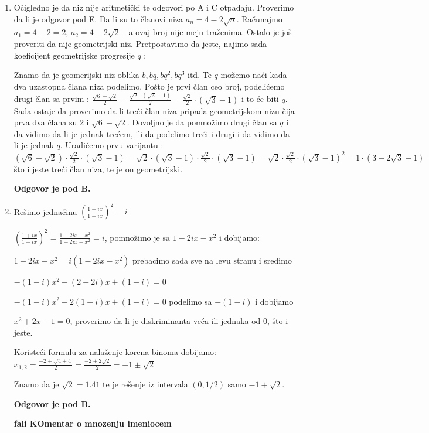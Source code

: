 \documentclass[a4paper,12pt]{report}
\begin{document}
\begin{enumerate}[1.]
\item O\v{c}igledno je da niz nije aritmeti\v{c}ki te odgovori po A i C otpadaju. Proverimo da li je odgovor pod E. Da li su to \v{c}lanovi niza $a_n = 4 - 2\sqrt{n} $. Ra\v{c}unajmo $a_1 = 4-2 = 2$, $a_2 = 4 - 2\sqrt{2}$ - a ovaj broj nije me\d{j}u tra\v{z}enima. Ostalo je jo\v{s} proveriti da nije geometrijski niz. Pretpostavimo da jeste, na\d{j}imo sada koeficijent geometrijske progresije $q$ :
\par Znamo da je geomerijski niz oblika $b, bq, bq^2, bq^3$ itd. Te $q$ mo\v{z}emo na\'{c}i kada dva uzastopna \v{c}lana niza podelimo. Po\v{s}to je prvi \v{c}lan ceo broj, podeli\'{c}emo drugi \v{c}lan sa prvim : $ \frac{\sqrt{6} - \sqrt{2}}{2} = \frac{\sqrt{2} \cdot (\sqrt{3} - 1)}{2} =\frac{\sqrt{2}}{2} \cdot (\sqrt{3} - 1) $ i to \'{c}e biti $q$. Sada ostaje da proverimo da li tre\'{c}i \v{c}lan niza pripada geometrijskom nizu \v{c}ija prva dva \v{c}lana su 2 i $\sqrt{6} - \sqrt{2}$. Dovoljno je da pomno\v{z}imo drugi \v{c}lan sa $q$ i da vidimo da li je jednak tre\'{c}em, ili da podelimo tre\'{c}i i drugi i da vidimo da li je jednak $q$. Uradi\'{c}emo prvu varijantu : $(\sqrt{6} - \sqrt{2}) \cdot \frac{\sqrt{2}}{2} \cdot (\sqrt{3} - 1) = \sqrt{2} \cdot (\sqrt{3} - 1) \cdot \frac{\sqrt{2}}{2} \cdot (\sqrt{3} - 1) = \sqrt{2} \cdot \frac{\sqrt{2}}{2} \cdot (\sqrt{3} - 1)^2 = 1 \cdot (3 - 2\sqrt{3} + 1) = 4 - 2\sqrt{2}$ \v{s}to i jeste tre\'{c}i \v{c}lan niza, te je on geometrijski. \par \textbf{Odgovor je pod B.}

\item Re\v{s}imo jedna\v{c}inu $(\frac{1 + ix}{1 - ix})^2 = i $
\par $(\frac{1 + ix}{1 - ix})^2 =\frac{1 +2ix -x^2}{1 -2ix - x^2} = i $, pomno\v{z}imo je sa $1 - 2ix -x^2$ i dobijamo:
\par $1 +2ix -x^2 = i(1 - 2ix -x^2)$ prebacimo sada sve na levu stranu i sredimo
\par $-(1-i)x^2 -(2-2i)x + (1-i) = 0$
\par $-(1-i)x^2 -2(1-i)x + (1-i) = 0$ podelimo sa $-(1-i)$ i dobijamo
\par $x^2 +2x -1 = 0$, proverimo da li je diskriminanta ve\'{c}a ili jednaka od 0, \v{s}to i jeste.
\par Koriste\'{c}i formulu za nala\v{z}enje korena binoma dobijamo: $x_{1,2} = \frac{-2 \pm \sqrt{4 + 4}}{2} = \frac{-2 \pm 2\sqrt{2}}{2} = -1 \pm \sqrt{2}$
\par Znamo da je $\sqrt{2} = 1.41$ te je re\v{s}enje iz intervala $(0,1/2)$ samo $-1 + \sqrt{2}$.
\par \textbf{Odgovor je pod B.}
\par  \textbf{fali KOmentar o mnozenju imeniocem}


\end{enumerate}
\end{document}
